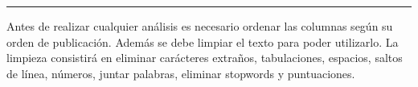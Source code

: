 \documentclass[
]{article}
\begin{document}
\begin{center}\rule{0.5\linewidth}{0.5pt}\end{center}

Antes de realizar cualquier análisis es necesario ordenar las columnas
según su orden de publicación. Además se debe limpiar el texto para
poder utilizarlo. La limpieza consistirá en eliminar carácteres
extraños, tabulaciones, espacios, saltos de línea, números, juntar
palabras, eliminar stopwords y puntuaciones.
\end{document}
